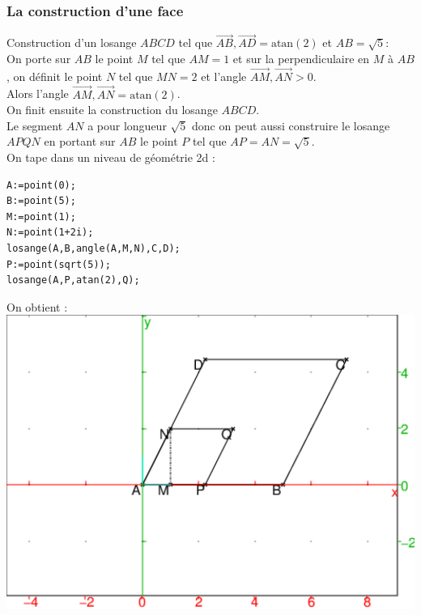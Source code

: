 \documentclass[a4paper,11pt]{book}
\newcommand{\atan}{\mbox{atan}}
\begin{document}
\subsubsection{La construction d'une face}
Construction d'un losange $ABCD$ tel que  
$\overrightarrow{AB},\overrightarrow{AD}=
\atan(2)$ et $AB=\sqrt 5$:\\
On porte sur $AB$ le point $M$ tel que $AM=1$ et sur la perpendiculaire en $M$ 
\`a $AB$, on d\'efinit le point $N$ tel que $MN=2$ et l'angle 
$\overrightarrow{AM},\overrightarrow{AN}>0$.\\
 Alors l'angle 
$\overrightarrow{AM},\overrightarrow{AN}=\atan(2)$. \\
On finit ensuite la construction du losange $ABCD$.\\
Le segment $AN$ a pour longueur $\sqrt 5$ donc on peut aussi construire le 
losange $APQN$ en portant sur $AB$ le point $P$ tel que $AP=AN=\sqrt 5$.\\
On tape dans un niveau de g\'eom\'etrie 2d :
\begin{verbatim}
A:=point(0);
B:=point(5);
M:=point(1);
N:=point(1+2i);
losange(A,B,angle(A,M,N),C,D);
P:=point(sqrt(5));
losange(A,P,atan(2),Q);
\end{verbatim}
On obtient :\\
\includegraphics[width=\textwidth]{triacon0}
\end{document}
